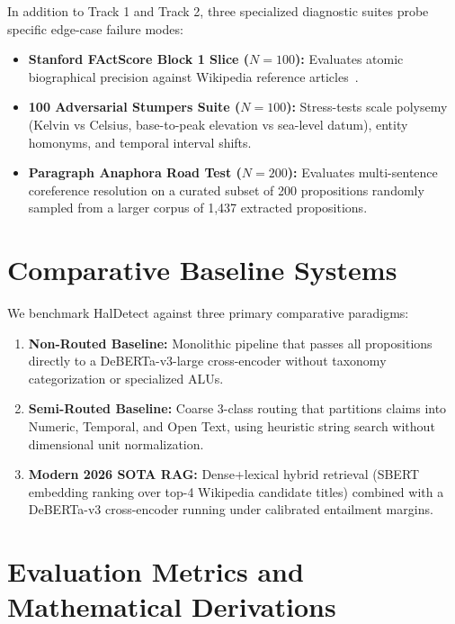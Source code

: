 In addition to Track 1 and Track 2, three specialized diagnostic suites probe specific edge-case failure modes:
\begin{itemize}
    \item \textbf{Stanford FActScore Block 1 Slice ($N=100$):} Evaluates atomic biographical precision against Wikipedia reference articles~\cite{min2023factscore}.
    \item \textbf{100 Adversarial Stumpers Suite ($N=100$):} Stress-tests scale polysemy (Kelvin vs Celsius, base-to-peak elevation vs sea-level datum), entity homonyms, and temporal interval shifts.
    \item \textbf{Paragraph Anaphora Road Test ($N=200$):} Evaluates multi-sentence coreference resolution on a curated subset of 200 propositions randomly sampled from a larger corpus of 1,437 extracted propositions.
\end{itemize}

\section{Comparative Baseline Systems}
\label{sec:baseline_systems}

We benchmark HalDetect against three primary comparative paradigms:
\begin{enumerate}
    \item \textbf{Non-Routed Baseline:} Monolithic pipeline that passes all propositions directly to a DeBERTa-v3-large cross-encoder without taxonomy categorization or specialized ALUs.
    \item \textbf{Semi-Routed Baseline:} Coarse 3-class routing that partitions claims into Numeric, Temporal, and Open Text, using heuristic string search without dimensional unit normalization.
    \item \textbf{Modern 2026 SOTA RAG:} Dense+lexical hybrid retrieval (SBERT embedding ranking over top-4 Wikipedia candidate titles) combined with a DeBERTa-v3 cross-encoder running under calibrated entailment margins.
\end{enumerate}

\section{Evaluation Metrics and Mathematical Derivations}
\label{sec:eval_metrics}

